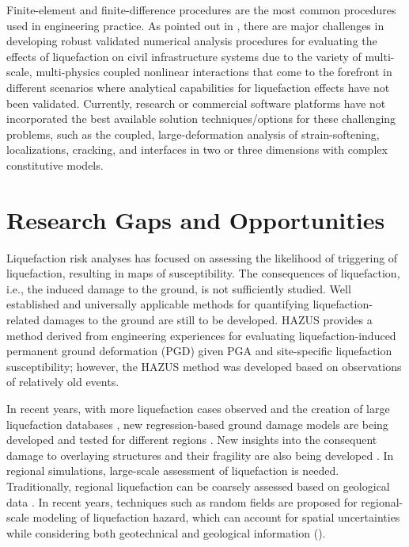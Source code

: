 Finite-element and finite-difference procedures are the most common procedures used in engineering practice. As pointed out in \citet{bray2017new}, there are major challenges in developing robust validated numerical analysis procedures for evaluating the effects of liquefaction on civil infrastructure systems due to the variety of multi-scale, multi-physics coupled nonlinear interactions that come to the forefront in different scenarios where analytical capabilities for liquefaction effects have not been validated. Currently, research or commercial software platforms have not incorporated the best available solution techniques/options for these challenging problems, such as the coupled, large-deformation analysis of strain-softening, localizations, cracking, and interfaces in two or three dimensions with complex constitutive models. 

\section{Research Gaps and Opportunities}
\label{sec:eq_liq_gaps}

Liquefaction risk analyses has focused on assessing the likelihood of triggering of liquefaction, resulting in maps of susceptibility. The consequences of liquefaction, i.e., the induced damage to the ground, is not sufficiently studied. Well established and universally applicable methods for quantifying liquefaction-related damages to the ground are still to be developed. HAZUS provides a method derived from engineering experiences for evaluating liquefaction-induced permanent ground deformation (PGD) given PGA and site-specific liquefaction susceptibility; however, the HAZUS method was developed based on observations of relatively old events.

In recent years, with more liquefaction cases observed \citep{cubrinovski2017liquefaction, bray2017new} and the creation of large liquefaction databases \citep{brandenberg2020nextgeneration}, new regression-based ground damage models are being developed \citep{khoshnevisan2015probabilistic, stewart2016peerngl} and tested for different regions \citep{chen2016probabilistic}. New insights into the consequent damage to overlaying structures and their fragility are also being developed \citep{bray20176th, fotopoulou2018vulnerability}. In regional simulations, large-scale assessment of liquefaction is needed. Traditionally, regional liquefaction can be coarsely assessed based on geological data \citep{holzer2006liquefaction}. In recent years, techniques such as random fields are proposed for regional-scale modeling of liquefaction hazard, which can account for spatial uncertainties while considering both geotechnical and geological information (\cite{zhu2017updated, wang2017spatial, wang2018hybrid}).




